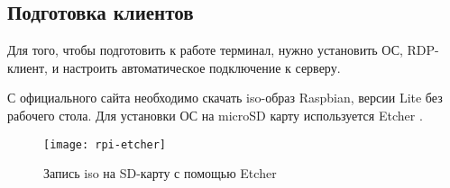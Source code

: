 \subsection{Подготовка клиентов}

Для того, чтобы подготовить к работе терминал, нужно установить ОС, RDP-клиент, и 
настроить автоматическое подключение к серверу.

С официального сайта \cite{ref:raspbian} необходимо скачать iso-образ Raspbian, версии
Lite без рабочего стола. Для установки ОС на microSD карту используется Etcher
\cite{ref:etcher}. 

\begin{figure}[h]
    \center
    \texttt{[image: rpi-etcher]}
    \caption{Запись iso на SD-карту с помощью Etcher}
    \label{pic:rpi-etcher}
\end{figure}

